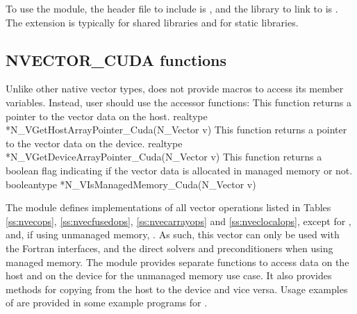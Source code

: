 To use the {\nveccuda} module, the header file to include is ,
and the library to link to is . The
extension  is typically  for shared libraries and 
for static libraries.

\subsection{NVECTOR\_CUDA functions}
\label{ss:nvec_cuda_functions}

Unlike other native {\sundials} vector types, {\nveccuda} does not provide macros
to access its member variables. Instead, user should use the accessor functions:
{
  This function returns a pointer to the vector data on the host.
}
{
  realtype *N\_VGetHostArrayPointer\_Cuda(N\_Vector v)
}
{
  This function returns a pointer to the vector data on the device.
}
{
  realtype *N\_VGetDeviceArrayPointer\_Cuda(N\_Vector v)
}
{
  This function returns a boolean flag indicating if the vector
  data is allocated in managed memory or not.
}
{
  booleantype *N\_VIsManagedMemory\_Cuda(N\_Vector v)
}

The {\nveccuda} module defines implementations of all vector operations listed
in Tables \ref{ss:nvecops}, \ref{ss:nvecfusedops}, \ref{ss:nvecarrayops}
and \ref{ss:nveclocalops}, except for , and, 
if using unmanaged memory, . 
As such, this vector can only be used with the {\sundials} Fortran interfaces,
and the {\sundials} direct solvers and preconditioners when using managed memory.
The {\nveccuda} module provides separate functions to access data on the host
and on the device for the unmanaged memory use case. It also provides methods
for copying from the host to the device and vice versa. Usage examples of
{\nveccuda} are provided in some example programs for {\cvode} \cite{cvode_ex}.

